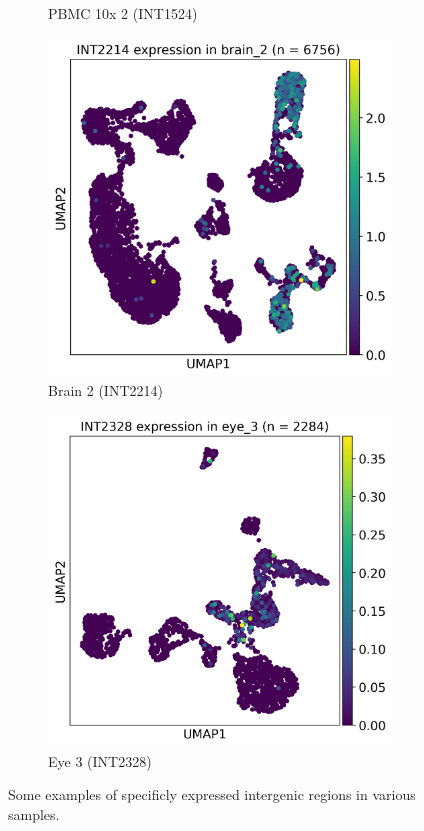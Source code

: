 \begin{figure}[htbp]
\begin{subfigure}{0.45\textwidth}
        \caption{PBMC 10x 2 (INT1524)}
    \end{subfigure}
    \vspace{0.5em}
    \begin{subfigure}{0.45\textwidth}
        \centering
        \includegraphics[width=\textwidth]{images/intergenicSpecificExamples/INT2214_brain_2.png}
        \caption{Brain 2 (INT2214)}
    \end{subfigure}
    \hfill
    \begin{subfigure}{0.45\textwidth}
        \centering
        \includegraphics[width=\textwidth]{images/intergenicSpecificExamples/INT2328_eye_3.png}
        \caption{Eye 3 (INT2328)}
    \end{subfigure}
    \caption{Some examples of specificly expressed intergenic regions in various samples.}
    \label{fig:intergenicSpecific}
\end{figure}

